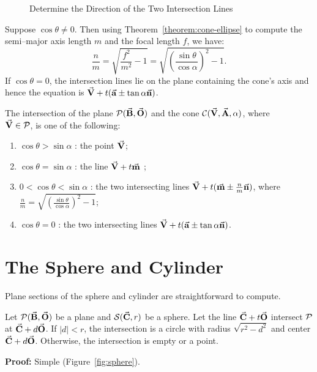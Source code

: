\begin{figure}
\vspace{4cm}
\caption{Determine the Direction of the Two Intersection Lines}
\label{fig:vtx-on-plane}
\end{figure}

     Suppose $\cos\theta\neq 0$.  Then using Theorem~\ref{theorem:cone-ellipse}
to compute the semi--major axis length
$m$ and the focal length $f$, we have:
\[   \frac{n}{m} = \sqrt{\frac{f^2}{m^2}-1}=
     \sqrt{\left(\frac{\sin\theta}{\cos\alpha}\right)^2-1}.  \]
If $\cos\theta=0$, the intersection lines lie on the plane
containing the cone's axis and hence the equation is
$\vec{\bf V}+t(\vec{\bf a}\pm\tan\alpha\vec{\bf n})$.

\begin{theorem}
\label{theorem:cone-line}
The intersection of the plane ${\cal P}(\vec{\bf B},\vec{\bf O})$ and the cone
${\cal C}(\vec{\bf V},\vec{\bf A},\alpha)$, where \\$\vec{\bf V}\in{\cal P}$,
is one of the following:
\begin{enumerate}
     \item $\cos\theta>\sin\alpha$ : the point $\vec{\bf V}$;
     \item $\cos\theta=\sin\alpha$ : the line $\vec{\bf V}+t\vec{\bf m}$ ;
     \item $0<\cos\theta<\sin\alpha$ : the two intersecting lines 
          $\vec{\bf V}+t(\vec{\bf m}\pm\frac{n}{m}\vec{\bf n})$,
  where $\frac{n}{m} = \sqrt{\left(\frac{\sin\theta}{\cos\alpha}\right)^2-1}$;
     \item $\cos\theta=0$ : the two intersecting lines 
          $\vec{\bf V}+t(\vec{\bf a}\pm\tan\alpha\vec{\bf n})$.
\end{enumerate}
\end{theorem}
     


\section{The Sphere and Cylinder}
\label{section:simple}

Plane sections of the sphere and cylinder are straightforward to compute.

\begin{lemma}
\label{lemma:sphere}
     Let ${\cal P}(\vec{\bf B},\vec{\bf O})$ be a plane and 
${\cal S}(\vec{\bf C},r)$ be a sphere.  Let the line $\vec{\bf C}+t\vec{\bf O}$
intersect ${\cal P}$ at $\vec{\bf C}+d\vec{\bf O}$.
If $|d| < r$, the intersection is a circle with radius $\sqrt{r^2-d^2}$ 
and center $\vec{\bf C}+d\vec{\bf O}$.
Otherwise, the intersection is empty or a point.
\end{lemma}
{\bf Proof:} Simple (Figure~\ref{fig:sphere}). \QED

